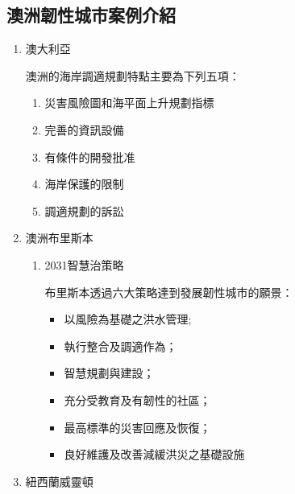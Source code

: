 \documentclass[a4paper,12pt]{article}
\begin{document}
\subsection{澳洲韌性城市案例介紹}
\label{sec:orgf459ca5}

\begin{enumerate}
\item 澳大利亞
\label{sec:org037115a}

澳洲的海岸調適規劃特點主要為下列五項：\\
\begin{enumerate}
\item 災害風險圖和海平面上升規劃指標\\
\item 完善的資訊設備\\
\item 有條件的開發批准\\
\item 海岸保護的限制\\
\item 調適規劃的訴訟\\
\end{enumerate}

\item 澳洲布里斯本
\label{sec:orge437a24}

\begin{enumerate}
\item 2031智慧治策略
\label{sec:org9a89d33}

布里斯本透過六大策略達到發展韌性城市的願景：\\
\begin{itemize}
\item 以風險為基礎之洪水管理;\\
\item 執行整合及調適作為；\\
\item 智慧規劃與建設；\\
\item 充分受教育及有韌性的社區；\\
\item 最高標準的災害回應及恢復；\\
\item 良好維護及改善減緩洪災之基礎設施\\
\end{itemize}
\end{enumerate}

\item 紐西蘭威靈頓
\label{sec:orgfe8035c}


\end{enumerate}
\end{document}
